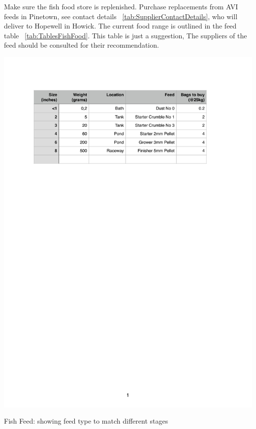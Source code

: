 Make sure the fish food store is replenished. Purchase replacements from AVI feeds in Pinetown, 
see contact details ~\ref{tab:SupplierContactDetails}, who will deliver to Hopewell in Howick.
The current food range is outlined in the feed table ~\ref{tab:TablesFishFood}. This table is
just a suggestion, The suppliers of the feed should be consulted for their recommendation.

\begin{table}[H]
  \centering
   \includegraphics[scale = 0.9]{tables/TablesFishFood.pdf}
   \caption{Fish Feed: showing feed type to match different stages} 
   \label{tab:TablesFishFood}
\end{table}


